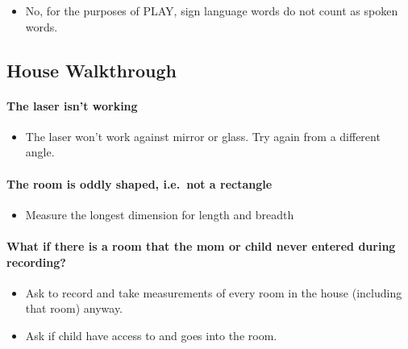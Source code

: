 \documentclass[
]{book}
\providecommand{\tightlist}{%
  \setlength{\itemsep}{0pt}\setlength{\parskip}{0pt}}
\begin{document}
\begin{itemize}
\tightlist
\item
  No, for the purposes of PLAY, sign language words do not count as spoken words.
\end{itemize}

\hypertarget{faqs_walkthrough}{%
\subsection{House Walkthrough}\label{faqs_walkthrough}}

\hypertarget{the-laser-isnt-working}{%
\paragraph*{The laser isn't working}\label{the-laser-isnt-working}}

\begin{itemize}
\tightlist
\item
  The laser won't work against mirror or glass. Try again from a different angle.
\end{itemize}

\hypertarget{the-room-is-oddly-shaped-i.e.-not-a-rectangle}{%
\paragraph*{The room is oddly shaped, i.e.~not a rectangle}\label{the-room-is-oddly-shaped-i.e.-not-a-rectangle}}

\begin{itemize}
\tightlist
\item
  Measure the longest dimension for length and breadth
\end{itemize}

\hypertarget{what-if-there-is-a-room-that-the-mom-or-child-never-entered-during-recording}{%
\paragraph*{What if there is a room that the mom or child never entered during recording?}\label{what-if-there-is-a-room-that-the-mom-or-child-never-entered-during-recording}}

\begin{itemize}
\tightlist
\item
  Ask to record and take measurements of every room in the house (including that room) anyway.
\item
  Ask if child have access to and goes into the room.
\end{itemize}
\end{document}
